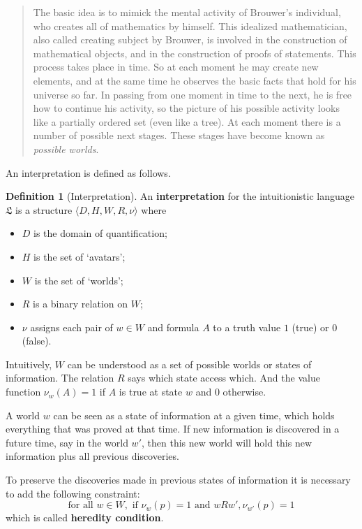 \documentclass[12pt,a4paper]{article}
\theoremstyle{definition}
\newtheorem{definition}{Definition}[section]
\begin{document}
\begin{quotation}
    The basic idea is to mimick the mental activity of Brouwer’s individual, who creates all of mathematics by himself. This idealized mathematician, also called creating subject by Brouwer, is involved in the construction of mathematical objects, and in the construction of proofs of statements. This process takes place in time. So at each moment he may create new elements, and at the same time he observes the basic facts that hold for his universe so far. In passing from one moment in time to the next, he is free how to  continue his activity, so the picture of his possible activity looks like a partially ordered set (even like a tree). At each moment there is a number of possible next stages. These stages have become known as \textit{possible worlds}. \cite[p. 236-237]{van2017lej}
\end{quotation}

An interpretation is defined as follows.

\begin{definition}[Interpretation]
    An \textbf{interpretation} for the intuitionistic language $\mathfrak{L}$ is a structure \( \langle D, H, W, R, \nu \rangle \) where
    \begin{itemize}
        \item $D$ is the domain of quantification;
        \item $H$ is the set of `avatars';
        \item $W$ is the set of `worlds';
        \item $R$ is a binary relation on $W$;
        \item $\nu$ assigns each pair of $w \in W$ and formula $A$ to a truth value $1$ (true) or $0$ (false).
    \end{itemize}
\end{definition}

Intuitively, $W$ can be understood as a set of possible worlds or states of information. The relation $R$ says which state access which. And the value function $\nu_w(A) = 1$ if $A$ is true at state $w$ and $0$ otherwise.

A world $w$ can be seen as a state of information at a given time, which holds everything that was proved at that time. If new information is discovered in a future time, say in the world $w'$, then this new world will hold this new information plus all previous discoveries.

To preserve the discoveries made in previous states of information it is necessary to add the following constraint:
\[
\text{for all } w \in W, \text{ if } \nu_w(p) = 1 \text{ and } wRw', \nu_{w'}(p) = 1
\]
which is called \textbf{heredity condition}.
\end{document}
